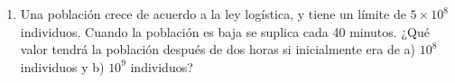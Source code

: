 \documentclass[14pt]{extarticle}
\begin{document}
\begin{enumerate}
{            \color{azul}
        }
        
        \item {
            Una población crece de acuerdo a la ley logística, y tiene un
            límite de $5\times 10^8$ individuos. Cuando la población es baja se
            suplica cada 40 minutos. ¿Qué valor tendrá la población después de
            dos horas si inicialmente era de a) $10^8$ individuos y b) $10^9$
            individuos?

            \color{azul}
        }
    \end{enumerate}
\end{document}
